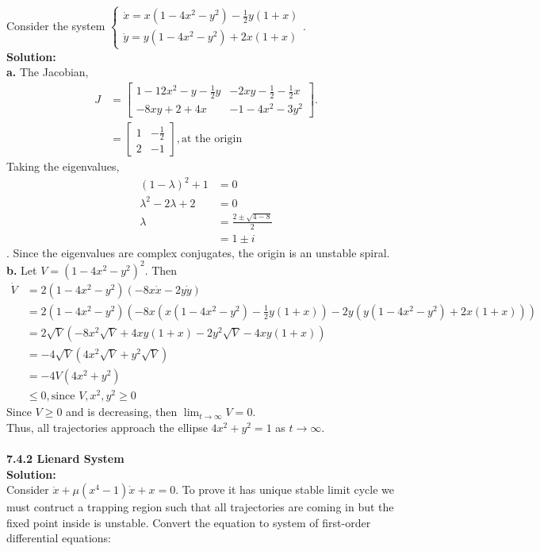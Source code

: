 \documentclass[12pt]{article}
\begin{document}
	Consider the system
	$\begin{cases}
	\dot{x} = x(1-4x^2 - y^2) - \frac{1}{2}y(1+x)\\
	\dot{y} = y(1-4x^2 -y^2) +2x(1+x)
	\end{cases}$.\\
	{\bf Solution:}\\
	\indent
	{\bf a. } The Jacobian,
	\begin{align*}
	J&=\begin{bmatrix}
	1-12x^2-y-\frac{1}{2}y & -2xy - \frac{1}{2} -\frac{1}{2}x\\
	-8xy +2 + 4x& -1 - 4x^2 - 3y^2
	\end{bmatrix}. \\
	&=\begin{bmatrix}
	1 & - \frac{1}{2}\\
	2 & -1 
	\end{bmatrix}, \text{at the origin}
	\end{align*}
	Taking the eigenvalues, 
	\begin{align*}
	(1-\lambda)^2 + 1 &=0\\
	\lambda^2 -2\lambda + 2 &=0\\
	\lambda &= \frac{2 \pm \sqrt{4-8}}{2}\\
	&= 1\pm i
	\end{align*}.
	Since the eigenvalues are complex conjugates, the origin is an unstable spiral.\\
	\indent
	{\bf b. } Let $V = (1-4x^2 -y^2)^2$. Then
	\begin{align*}
	\dot{V} &= 2(1-4x^2-y^2)(-8x\dot{x}-2y\dot{y})\\
	&=2(1-4x^2-y^2)(-8x(x(1-4x^2 - y^2) - \frac{1}{2}y(1+x))-2y(y(1-4x^2 -y^2) +2x(1+x)))\\
	&=2\sqrt{V}(-8x^2\sqrt{V}+4xy(1+x) -2y^2\sqrt{V} - 4xy(1+x))\\
	&=-4\sqrt{V}(4x^2\sqrt{V}+y^2\sqrt{V})\\
	&=-4V(4x^2 + y^2)\\
	& \leq 0, \text{since } V,x^2, y^2 \geq 0
	\end{align*}
	Since $V\geq 0$ and is decreasing, then $\lim_{t \to \infty} V = 0$.
	\\Thus, all trajectories approach the ellipse $4x^2 + y^2 = 1$ as $t\to\infty$.\\
	\bigskip\noindent
	\\
	{\bf 7.4.2 Lienard System}\\
	{\bf Solution:} \\
	Consider $\ddot{x} + \mu(x^4-1)\dot{x} + x = 0$. To prove it has unique stable limit cycle we must contruct a trapping region such that all trajectories are coming in but the fixed point inside is unstable. Convert the equation to system of first-order differential equations:
\end{document}
